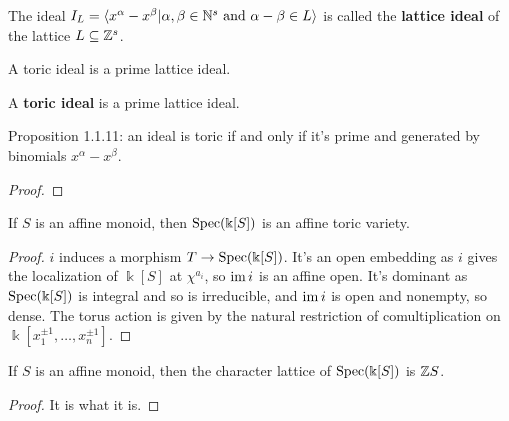\begin{definition}
  \label{1-1-10-lattice-ideal}
  \uses{}
  \leanok

  The ideal $I_L = \langle x^\alpha - x^\beta |  \alpha, \beta \in {\mathbb N}^s \text{ and } \alpha - \beta \in L\rangle$ is called the {\bf lattice ideal} of the lattice $L \subseteq {\mathbb Z}^s$.

  A toric ideal is a prime lattice ideal.
\end{definition}


\begin{definition}
  \label{1-1-10-toric-ideal}
  \leanok
  A {\bf toric ideal} is a prime lattice ideal.
\end{definition}


\begin{proposition}
  \label{1-1-11-toric-ideal-gen-binomial}

  Proposition 1.1.11: an ideal is toric if and only if it's prime and generated by binomials $x^\alpha - x^\beta$.
\end{proposition}
\begin{proof}

\end{proof}


\begin{proposition}
  \label{1-1-14-aff-tor-var-spec-aff-mon-alg}

  If $S$ is an affine monoid, then $\operatorname{Spec}(\Bbbk[S])$ is an affine toric variety.
\end{proposition}
\begin{proof}

  $i$ induces a morphism $T \to \operatorname{Spec}(\Bbbk[S])$. It's an open embedding as $i$ gives the localization of $\Bbbk[S]$ at $\chi^{a_i}$, so $\operatorname{im} i$ is an affine open. It's dominant as $\operatorname{Spec}(\Bbbk[S])$ is integral and so is irreducible, and $\operatorname{im} i$ is open and nonempty, so dense. The torus action is given by the natural restriction of comultiplication on $\Bbbk[x_1^{\pm1}, \dotsc, x_n^{\pm1}]$.
\end{proof}


\begin{proposition}
  \label{1-1-14-char-spec-aff-mon-alg}

  If $S$ is an affine monoid, then the character lattice of $\operatorname{Spec}(\Bbbk[S])$ is ${\mathbb Z} S$.
\end{proposition}
\begin{proof}
  \uses{}

  It is what it is.
\end{proof}



